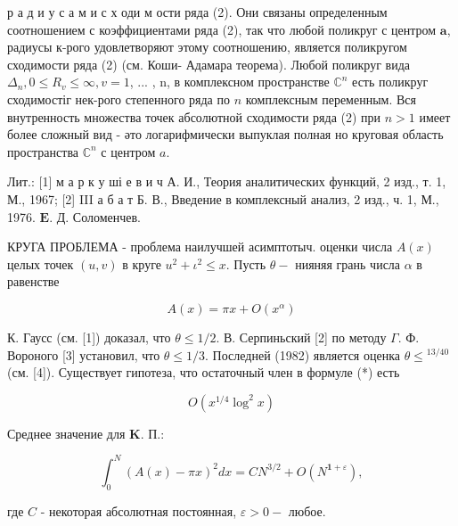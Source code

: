\documentclass[10pt]{article}
\begin{document}
р а д и у с а м и с х оди м ости ряда (2). Они связаны определенным соотношением с коэффициентами ряда (2), так что любой поликруг с центром $\boldsymbol{a}$, радиусы к-рого удовлетворяют этому соотношению, является поликругом сходимости ряда (2) (см. Коши- Адамара теорема). Любой поликруг вида $\Delta_{n}, 0 \leqslant R_{v} \leqslant \infty, v=1$, ... , n, в комплексном пространстве $\mathbb{C}^{n}$ есть поликруг сходимостіг нек-рого степенного ряда по $n$ комплексным переменным. Вся внутренность множества точек абсолютной сходимости ряда (2) при $n>1$ имеет более сложный вид - әто логарифмически выпуклая полная но круговая область пространства $\mathbb{C}^{n}$ с центром $a$.



Лит.: [1] м а р к у ші е в и ч А. И., Теория аналитических функций, 2 изд., т. 1, М., 1967; [2] III а б а т Б. В., Введение в комплексный анализ, 2 изд., ч. 1, М., 1976. $\boldsymbol{E}$. Д. Соломенчев.



КРУГА ПРОБЛЕМА - проблема наилучшей асимптотыч. оценки числа $A(x)$ целых точек $(u, v)$ в круге $u^{2}+\iota^{2} \leqslant x$. Пусть $\theta-$ нияняя грань числа $\alpha$ в равенстве



\[

A(x)=\pi x+O\left(x^{\alpha}\right)

\]



К. Гаусс (см. [1]) доказал, что $\theta \leqslant 1 / 2$. В. Серпиньский [2] по методу $\Gamma$. Ф. Вороного [3] установил, что $\theta \leqslant 1 / 3$. Последней (1982) является оценка $\theta \leqslant{ }^{13 / 40}$ (см. [4]). Существует гипотеза, что остаточный член в формуле (*) есть



\[

O\left(x^{1 / 4} \log ^{2} x\right)

\]



Среднее значение для $\boldsymbol{K}$. П.:



\[

\int_{0}^{N}(A(x)-\pi x)^{2} d x=C N^{3 / 2}+O\left(N^{\mathbf{1}+\varepsilon}\right),

\]



где $C$ - некоторая абсолютная постоянная, $\varepsilon>0-$ любое.
\end{document}
